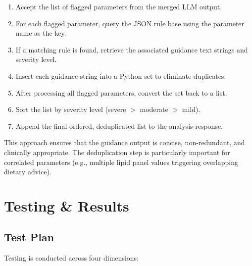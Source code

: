 \documentclass[12pt,a4paper]{report}
\begin{document}
\begin{enumerate}
    \item Accept the list of flagged parameters from the merged LLM output.
    \item For each flagged parameter, query the JSON rule base using the parameter name as the key.
    \item If a matching rule is found, retrieve the associated guidance text strings and severity level.
    \item Insert each guidance string into a Python set to eliminate duplicates.
    \item After processing all flagged parameters, convert the set back to a list.
    \item Sort the list by severity level (severe $>$ moderate $>$ mild).
    \item Append the final ordered, deduplicated list to the analysis response.
\end{enumerate}

This approach ensures that the guidance output is concise, non-redundant, and clinically appropriate. The deduplication step is particularly important for correlated parameters (e.g., multiple lipid panel values triggering overlapping dietary advice).

\chapter{Testing \& Results}

\section{Test Plan}
Testing is conducted across four dimensions:
\end{document}
